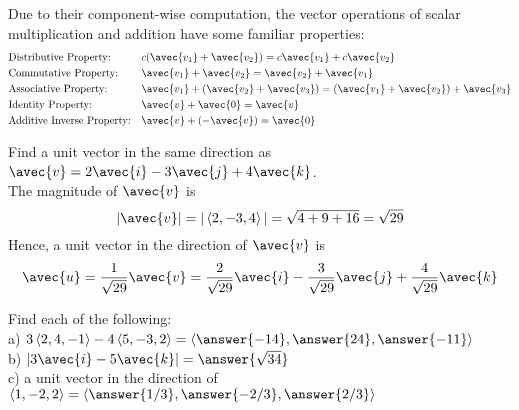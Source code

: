 \documentclass[handout]{ximera}
\begin{document}
Due to their component-wise computation, the vector operations of scalar multiplication and addition have some familiar properties:
\begin{align*}
&\text{Distributive Property:} & &c(\avec{v_1} + \avec{v_2}) = c\avec{v_1} + c\avec{v_2}   \\
& \text{Commutative Property:}& &\avec{v_1} + \avec{v_2} = \avec{v_2} + \avec{v_1} \\
& \text{Associative Property:}&  &\avec{v_1} + (\avec{v_2}+ \avec{v_3}) =  (\avec{v_1} + \avec{v_2}) + \avec{v_3} \\
&\text{Identity Property:} & &\avec{v} + \avec{0} = \avec{v} \\
& \text{Additive Inverse Property:} & &\avec{v} + (-\avec{v}) = \avec{0} 
\end{align*}

\begin{example}
Find a unit vector in the same direction as $\avec{v} = 2 \avec{i} - 3\avec{j} + 4\avec{k}$.\\
The magnitude of $\avec{v}$ is
\[
|\avec{v}| = |\vector{2, -3, 4}| = \sqrt{4+9+16} = \sqrt{29}
\]
Hence, a unit vector in the direction of $\avec{v}$ is
\[
\avec{u} = \frac{1}{\sqrt{29}}\avec{v} = \frac{2}{\sqrt{29}}\avec{i} - \frac{3}{\sqrt{29}}\avec{j} + \frac{4}{\sqrt{29}}\avec{k}
\]
\end{example}

\begin{problem}
Find each of the following:\\
a) $3\vector{2, 4, -1} - 4\vector{5, -3, 2} = \vector{\answer{-14}, \answer{24}, \answer{-11}}$\\
b) $|3\avec{i} - 5\avec{k}| = \answer{\sqrt{34}}$\\
c) a unit vector in the direction of $\vector{1, -2, 2} = \vector{\answer{1/3}, \answer{-2/3}, \answer{2/3}}$
\end{problem}
\end{document}
